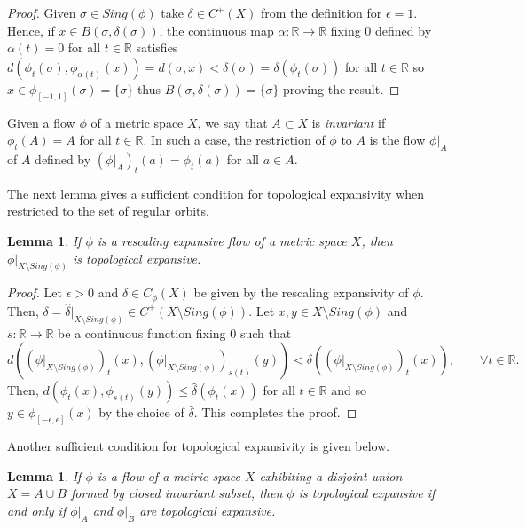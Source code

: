 \documentclass[11pt,letterpaper]{amsart}
\newtheorem{lemma}[thm]{Lemma}
\begin{document}
\begin{proof}
Given $\sigma\in Sing(\phi)$ take $\delta\in C^+(X)$ from the definition for $\epsilon=1$. Hence, if $x\in B(\sigma,\delta(\sigma))$,
the continuous map $\alpha:\mathbb{R}\to\mathbb{R}$ fixing $0$ defined by
$\alpha(t)=0$ for all $t\in\mathbb{R}$ satisfies
$d(\phi_t(\sigma),\phi_{\alpha(t)}(x))=d(\sigma,x)<\delta(\sigma)=\delta(\phi_t(\sigma))$ for all $t\in\mathbb{R}$ so $x\in \phi_{[-1,1]}(\sigma)=\{\sigma\}$ thus
$B(\sigma,\delta(\sigma))=\{\sigma\}$ proving the result.
\end{proof}

Given a flow $\phi$ of a metric space $X$, we say that $A\subset X$ is {\em invariant} if $\phi_t(A)=A$ for all $t\in\mathbb{R}$. In such a case, the restriction of $\phi$ to $A$ is the flow $\phi|_A$ of $A$ defined by
$(\phi|_A)_t(a)=\phi_t(a)$ for all $a\in A$.

The next lemma gives a sufficient condition for topological expansivity when restricted to the set of regular orbits.

\begin{lemma}
\label{meta}
If $\phi$ is a rescaling expansive flow of a metric space $X$, then
$\phi|_{X\setminus Sing(\phi)}$ is topological expansive.
\end{lemma}

\begin{proof}
Let $\epsilon>0$ and $\hat{\delta}\in C_\phi(X)$ be given by the rescaling expansivity of $\phi$. Then, $\delta=\hat{\delta}|_{X\setminus Sing(\phi)}\in C^+(X\setminus Sing(\phi))$.
Let $x,y\in X\setminus Sing(\phi)$ and $s:\mathbb{R}\to\mathbb{R}$
be a continuous function fixing $0$ such that
$$
d((\phi|_{X\setminus Sing(\phi)})_t(x),(\phi|_{X\setminus Sing(\phi)})_{s(t)}(y))<\delta((\phi|_{X\setminus Sing(\phi)})_t(x)),
\qquad\forall t\in\mathbb{R}.
$$
Then, $d(\phi_t(x),\phi_{s(t)}(y))\leq\hat{\delta}(\phi_t(x))$ for all $t\in\mathbb{R}$
and so $y\in \phi_{[-\epsilon,\epsilon]}(x)$ by the choice of $\hat{\delta}$.
This completes the proof.
\end{proof}

Another sufficient condition for topological expansivity is given below.

\begin{lemma}
\label{chuzo}
If $\phi$ is a flow of a metric space $X$ exhibiting a disjoint union
$X=A\cup B$ formed by closed invariant subset, then $\phi$ is topological expansive if and only if $\phi|_A$ and $\phi|_B$ are topological expansive.
\end{lemma}
\end{document}
